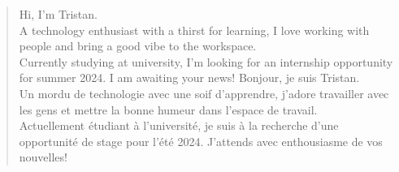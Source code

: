 \documentclass[10pt,a4paper,ragged2e,withhyper]{altacv}
\begin{document}
\begin{paracol}{2}
        
        
        
        
        
        \newpage
        
        \switchcolumn
        
        \smallskip
        \cvsection{
            }
            \begin{quote}
                Hi, I'm Tristan.\\
                \smallskip
                A technology enthusiast with a thirst for learning, I love working with people and bring a good vibe to the workspace.\\
                \smallskip
                Currently studying at university, I'm looking for an internship opportunity for summer 2024. I am awaiting your news!
                Bonjour, je suis Tristan.\\
                \smallskip
                Un mordu de technologie avec une soif d'apprendre, j'adore travailler avec les gens et mettre la bonne humeur dans l’espace de travail.\\
                \smallskip
                Actuellement étudiant à l'université, je suis à la recherche d'une opportunité de stage pour l'été 2024. J'attends avec enthousiasme de vos nouvelles!
            \end{quote}
        

\end{paracol}
\end{document}
